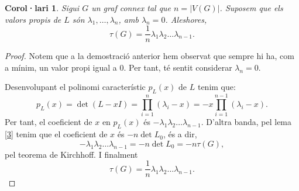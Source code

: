 \documentclass{article}
\newtheorem{corollary}{Corol·lari}[section]
\begin{document}
\begin{corollary}\label{cor1}
    Sigui $G$ un graf connex tal que $n=|V(G)|$. Suposem que els valors propis de $L$ són $\lambda_1,\ldots,\lambda_n$, amb $\lambda_n=0$. Aleshores, $$\tau(G)=\frac{1}{n}\lambda_1\lambda_2\ldots\lambda_{n-1}.$$
\end{corollary}
\begin{proof}
    Notem que a la demostració anterior hem observat que sempre hi ha, com a mínim, un valor propi igual a 0. Per tant, té sentit considerar $\lambda_n=0$.\par
    Desenvolupant el polinomi característic $p_L(x)$ de $L$ tenim que: $$p_L(x)=\det(L-xI)=\prod_{i=1}^n(\lambda_i-x)=-x\prod_{i=1}^{n-1}(\lambda_i-x).$$ Per tant, el coeficient de $x$ en $p_L(x)$ és $-\lambda_1\lambda_2\ldots\lambda_{n-1}$. D'altra banda, pel lema \ref{3} tenim que el coeficient de $x$ és $-n\det L_0$, és a dir, $$-\lambda_1\lambda_2\ldots\lambda_{n-1}=-n\det L_0=-n\tau(G),$$ pel teorema de Kirchhoff. I finalment $$\tau(G)=\frac{1}{n}\lambda_1\lambda_2\ldots\lambda_{n-1}.$$ \cite{2}
\end{proof}
\end{document}
